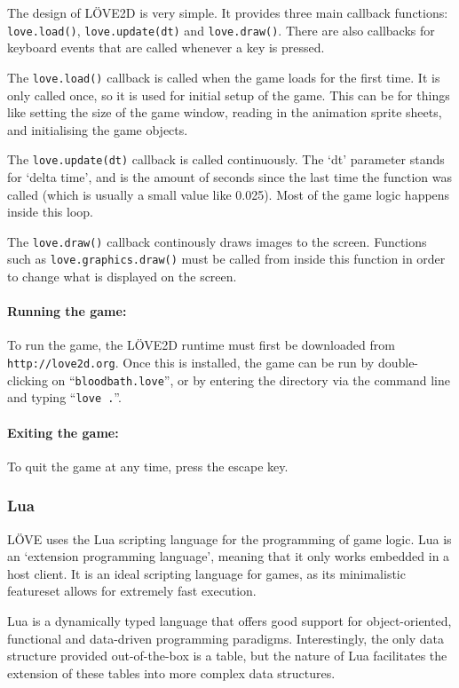 \documentclass[11pt]{article}
\begin{document}
The design of L\"{O}VE2D is very simple. It provides three main callback functions: \texttt{love.load()}, \texttt{love.update(dt)} and \texttt{love.draw()}. There are also callbacks for keyboard events that are called whenever a key is pressed.

The \texttt{love.load()} callback is called when the game loads for the first time. It is only called once, so it is used for initial setup of the game. This can be for things like setting the size of the game window, reading in the animation sprite sheets, and initialising the game objects.

The \texttt{love.update(dt)} callback is called continuously. The `dt' parameter stands for `delta time', and is the amount of seconds since the last time the function was called (which is usually a small value like 0.025). Most of the game logic happens inside this loop.

The \texttt{love.draw()} callback continously draws images to the screen. Functions such as \texttt{love.graphics.draw()} must be called from inside this function in order to change what is displayed on the screen.

\paragraph{Running the game:} To run the game, the L\"{O}VE2D runtime must first be downloaded from \texttt{http://love2d.org}. Once this is installed, the game can be run by double-clicking on ``\texttt{bloodbath.love}'', or by entering the directory via the command line and typing ``\texttt{love .}''.

\paragraph{Exiting the game:} To quit the game at any time, press the escape key.

\subsubsection{Lua}
L\"{O}VE uses the Lua \cite{lua} scripting language for the programming of game logic. Lua is an `extension programming language', meaning that it only works embedded in a host client. It is an ideal scripting language for games, as its minimalistic featureset allows for extremely fast execution.

Lua is a dynamically typed language that offers good support for object-oriented, functional and data-driven programming paradigms. Interestingly, the only data structure provided out-of-the-box is a table, but the nature of Lua facilitates the extension of these tables into more complex data structures.
\end{document}
